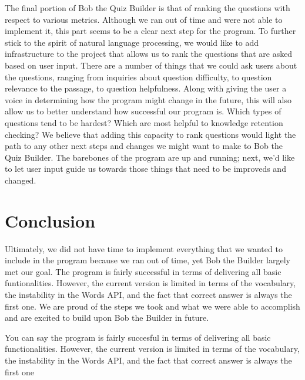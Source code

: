 \documentclass[finalcopy]{srpaper}
\begin{document}
The final portion of Bob the Quiz Builder is that of ranking the questions with respect to various metrics. Although we ran out of time and were not able to implement it, this part seems to be a clear next step for the program. To further stick to the spirit of natural language processing, we would like to add infrastructure to the project that allows us to rank the questions that are asked based on user input. There are a number of things that we could ask users about the questions, ranging from inquiries about question difficulty, to question relevance to the passage, to question helpfulness. Along with giving the user a voice in determining how the program might change in the future, this will also allow us to better understand how successful our program is. Which types of questions tend to be hardest? Which are most helpful to knowledge retention checking? We believe that adding this capacity to rank questions would light the path to any other next steps and changes we might want to make to Bob the Quiz Builder. The barebones of the program are up and running; next, we'd like to let user input guide us towards those things that need to be improveds and changed. 
 





%
%
\chapter{Conclusion}
\label{Conclusion}

Ultimately, we did not have time to implement everything that we wanted to include in the program because we ran out of time, yet Bob the Builder largely met our goal. The program is fairly successful in terms of delivering all basic funtionalities. However, the current version is limited in terms of the vocabulary, the instability in the Words API, and the fact that correct answer is always the first one. We are proud of the steps we took and what we were able to accomplish and are excited to build upon Bob the Builder in future.



You can say the program is fairly succesful in terms of delivering all basic functionalities. However, the current version is limited in terms of the vocabulary, the instability in the Words API, and the fact that correct answer is always the first one
\end{document}
